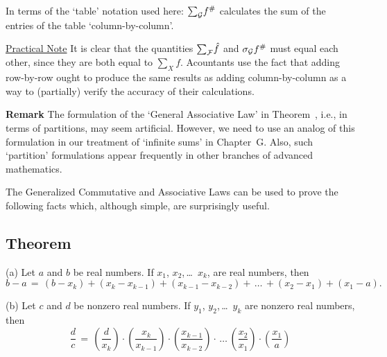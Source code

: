         In terms of the `table' notation used here: ${\sum}_{{\cal G}} f^{\#}$ calculates the sum of the entries of the table `column-by-column'.

        \underline{Practical Note} It is clear that the quantities ${\sum}_{{\cal F}} \hat{f}$ and ${\sigma}_{{\cal G}} f^{\#}$ must equal each other, since they are both equal to ${\sum}_{X} f$.
    Acountants use the fact that adding row-by-row ought to produce the same results as adding column-by-column as a way to (partially) verify the accuracy of their calculations.

\V
\V

        {\bf Remark} The formulation of the `General Associative Law' in Theorem~, i.e., in terms of partitions,
    may seem artificial.
    However, we need to use an analog of this formulation in our treatment of `infinite sums' in Chapter~G.
    Also, such `partition' formulations appear frequently in other branches of advanced mathematics.

\V
\V

        The Generalized Commutative and Associative Laws can be used to prove the following facts which, although simple, are surprisingly useful.

\V

        \subsection{\small{{\bf Theorem}}}
        \label{ThmB10.100}

\V

\hspace*{\parindent}(a) Let $a$ and $b$ be real numbers. If $x_{1}$, $x_{2}$,\,{\ldots}\, $x_{k}$, are real numbers, then
        \begin{displaymath}
        b-a \,=\, (b-x_{k}) + (x_{k}-x_{k-1}) + (x_{k-1}-x_{k-2}) + \,{\ldots}\, + (x_{2}-x_{1}) + (x_{1}-a).
        \end{displaymath}

\V

        (b) Let $c$ and $d$ be nonzero real numbers. If $y_{1}$, $y_{2}$,\,{\ldots}\, $y_{k}$ are nonzero real numbers, then
        \begin{displaymath}
        \frac{d}{c} \,=\, \left(\frac{d}{x_{k}}\right){\cdot} 
                          \left(\frac{x_{k}}{x_{k-1}}\right){\cdot}
                          \left(\frac{x_{k-1}}{x_{k-2}}\right){\cdot}
        \,{\ldots}\,
                          \left(\frac{x_{2}}{x_{1}}\right){\cdot}
                          \left(\frac{x_{1}}{a}\right)
        \end{displaymath}

